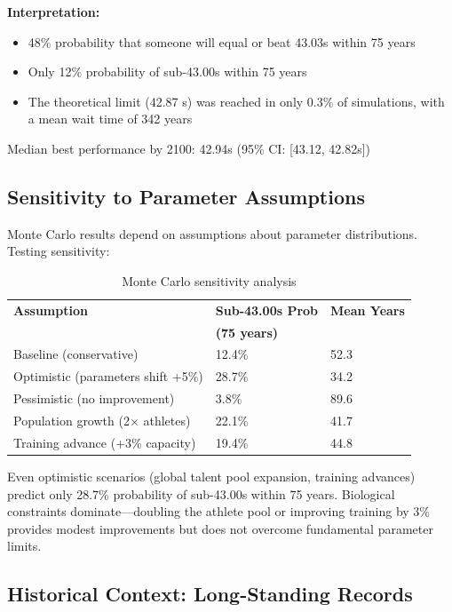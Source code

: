 \textbf{Interpretation:}
\begin{itemize}
    \item 48\% probability that someone will equal or beat 43.03s within 75 years
    \item Only 12\% probability of sub-43.00s within 75 years
    \item The theoretical limit (42.87 s) was reached in only 0.3\% of simulations, with a mean wait time of 342 years
\end{itemize}

Median best performance by 2100: 42.94s (95\% CI: [43.12, 42.82s])

\subsection{Sensitivity to Parameter Assumptions}

Monte Carlo results depend on assumptions about parameter distributions. Testing sensitivity:

\begin{table}[H]
\centering
\caption{Monte Carlo sensitivity analysis}
\begin{tabular}{@{}lll@{}}
\toprule
\textbf{Assumption} & \textbf{Sub-43.00s Prob} & \textbf{Mean Years} \\
 & \textbf{(75 years)} & \\
\midrule
Baseline (conservative) & 12.4\% & 52.3 \\
Optimistic (parameters shift +5\%) & 28.7\% & 34.2 \\
Pessimistic (no improvement) & 3.8\% & 89.6 \\
Population growth (2× athletes) & 22.1\% & 41.7 \\
Training advance (+3\% capacity) & 19.4\% & 44.8 \\
\bottomrule
\end{tabular}
\end{table}

Even optimistic scenarios (global talent pool expansion, training advances) predict only 28.7\% probability of sub-43.00s within 75 years. Biological constraints dominate—doubling the athlete pool or improving training by 3\% provides modest improvements but does not overcome fundamental parameter limits.

\subsection{Historical Context: Long-Standing Records}

